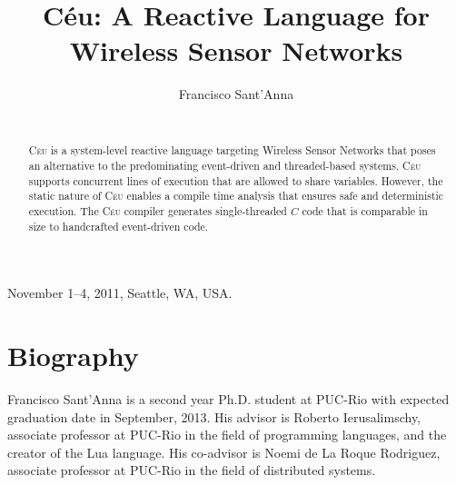 \documentclass[10pt]{sigplan-proc-varsize-sensys11}
\newcommand{\2}{\;\;}
\newcommand{\5}{\;\;\;\;\;}
\newcommand{\CEU}{\textsc{C\'{e}u}}
\begin{document}
\title{C\'eu: A Reactive Language for Wireless Sensor Networks}

\author{
    {Francisco Sant'Anna} \\
     \\
}


 {November 1--4, 2011, Seattle, WA, USA.}

\maketitle

\begin{abstract}

\CEU{} is a system-level reactive language targeting Wireless Sensor Networks 
that poses an alternative to the predominating event-driven and threaded-based 
systems.
\CEU{} supports concurrent lines of execution that are allowed to share 
variables.
However, the static nature of \CEU{} enables a compile time analysis that 
ensures safe and deterministic execution.
The \CEU{} compiler generates single-threaded $C$ code that is comparable in 
size to handcrafted event-driven code.

\end{abstract}

\section{Biography}
\label{sec.bio}

Francisco Sant'Anna is a second year Ph.D. student at PUC-Rio with expected 
graduation date in September, 2013.
His advisor is Roberto Ierusalimschy, associate professor at PUC-Rio in the 
field of programming languages, and the creator of the Lua language.
His co-advisor is Noemi de La Roque Rodriguez, associate professor at PUC-Rio 
in the field of distributed systems.
\end{document}
